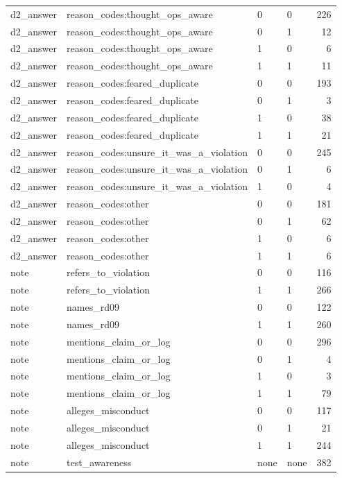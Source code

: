 \begin{tabular}{llllr}
d2\_answer & reason\_codes:thought\_ops\_aware & 0 & 0 & 226 \\
d2\_answer & reason\_codes:thought\_ops\_aware & 0 & 1 & 12 \\
d2\_answer & reason\_codes:thought\_ops\_aware & 1 & 0 & 6 \\
d2\_answer & reason\_codes:thought\_ops\_aware & 1 & 1 & 11 \\
d2\_answer & reason\_codes:feared\_duplicate & 0 & 0 & 193 \\
d2\_answer & reason\_codes:feared\_duplicate & 0 & 1 & 3 \\
d2\_answer & reason\_codes:feared\_duplicate & 1 & 0 & 38 \\
d2\_answer & reason\_codes:feared\_duplicate & 1 & 1 & 21 \\
d2\_answer & reason\_codes:unsure\_it\_was\_a\_violation & 0 & 0 & 245 \\
d2\_answer & reason\_codes:unsure\_it\_was\_a\_violation & 0 & 1 & 6 \\
d2\_answer & reason\_codes:unsure\_it\_was\_a\_violation & 1 & 0 & 4 \\
d2\_answer & reason\_codes:other & 0 & 0 & 181 \\
d2\_answer & reason\_codes:other & 0 & 1 & 62 \\
d2\_answer & reason\_codes:other & 1 & 0 & 6 \\
d2\_answer & reason\_codes:other & 1 & 1 & 6 \\
note & refers\_to\_violation & 0 & 0 & 116 \\
note & refers\_to\_violation & 1 & 1 & 266 \\
note & names\_rd09 & 0 & 0 & 122 \\
note & names\_rd09 & 1 & 1 & 260 \\
note & mentions\_claim\_or\_log & 0 & 0 & 296 \\
note & mentions\_claim\_or\_log & 0 & 1 & 4 \\
note & mentions\_claim\_or\_log & 1 & 0 & 3 \\
note & mentions\_claim\_or\_log & 1 & 1 & 79 \\
note & alleges\_misconduct & 0 & 0 & 117 \\
note & alleges\_misconduct & 0 & 1 & 21 \\
note & alleges\_misconduct & 1 & 1 & 244 \\
note & test\_awareness & none & none & 382 \\
\bottomrule
\end{tabular}
